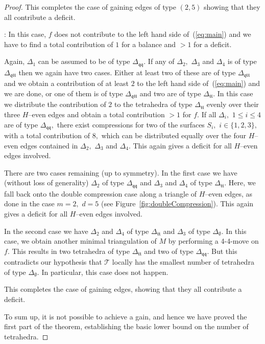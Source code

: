 \documentclass[a4paper]{gtart}
\def\tri{\mathcal{T}}
\def\manifold{M}
\def\Tee{\Delta_{\emptyset}}
\def\Ttt{\Delta_{\mathfrak{tt}}}
\def\Tqtt{\Delta_{\mathfrak{qtt}}}
\def\Tqq{\Delta_{\mathfrak{qq}}}
\theoremstyle{plain}
\theoremstyle{definition}
\theoremstyle{remark}
\numberwithin{equation}{section}
\begin{document}
\begin{proof}
This completes the case of gaining edges of type $(2,5)$ showing that they all contribute a deficit.

\medskip 

: In this case, $f$ does not contribute to the left hand side of~(\ref{eq:main}) and we have to find a total contribution of $1$ for a balance and $>1$ for a deficit.

Again, $\Delta_1$ can be assumed to be of type $\Tqq.$ If any of $\Delta_2,$ $\Delta_3$ and $\Delta_4$ is of type $\Tqtt$ then we again have two cases. Either at least two of these are of type $\Tqtt$ and 
we obtain a contribution of at least $2$ to the left hand side of~(\ref{eq:main}) and we are done, or one of them is of type $\Tqtt$ and two are of type $\Ttt.$ In this case we distribute the contribution of $2$ to the tetrahedra of type $\Ttt$ evenly over their three $H$--even edges and obtain a total contribution $>1$ for $f.$
If all $\Delta_i,$ $1 \leq i \leq 4$ are of type $\Tqq,$ there exist compressions for two of the surfaces $S_i,$ $i \in \{1,2,3\},$ with a total contribution of $8,$ which can be distributed equally over the four $H$--even edges contained in $\Delta_2,$ $\Delta_3$ and $\Delta_4.$ This again gives a deficit for all $H$--even edges involved.

There are two cases remaining (up to symmetry). In the first case we have (without loss of generality) $\Delta_2$ of type $\Tqq$ and $\Delta_3$ and $\Delta_4$ of type $\Ttt.$ Here, we fall back onto the double compression case along a triangle of $H$--even edges, as done in the case $m=2,$ $d=5$ (see Figure~\ref{fig:doubleCompression}). This again gives a deficit for all $H$--even edges involved.

In the second case we have $\Delta_2$ and $\Delta_4$ of type $\Ttt$ and $\Delta_3$ of type $\Tee.$ In this case, we obtain another minimal triangulation of $\manifold$ by performing a 4-4-move on $f.$ This results in two tetrahedra of type $\Ttt$ and two of type $\Tqq.$ But this contradicts our hypothesis that $\tri$ locally has the smallest number of tetrahedra of type $\Tee.$ In particular, this case does not happen. 

This completes the case of gaining edges, showing that they all contribute a deficit.
	
\medskip
	
To sum up, it is not possible to achieve a gain, and hence we have proved the first part of the theorem, establishing the basic lower bound on the number of tetrahedra.


\end{proof}
\end{document}
